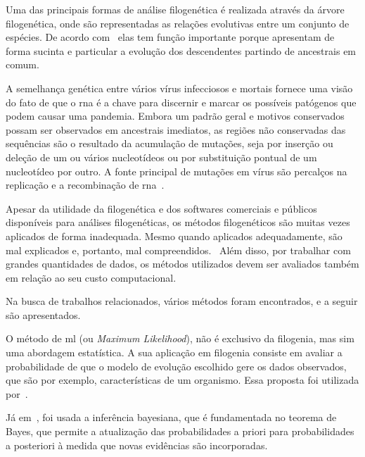 Uma das principais formas de análise filogenética é realizada através da árvore filogenética, onde são representadas as relações evolutivas entre um conjunto de espécies. De acordo com~\cite{morrison_tree_thinking} elas tem função importante porque apresentam de forma sucinta e particular a evolução dos descendentes partindo de ancestrais em comum.

A semelhança genética entre vários vírus infecciosos e mortais fornece uma visão do fato de que o \ac{rna} é a chave para discernir e marcar os possíveis patógenos que podem causar uma pandemia. Embora um padrão geral e motivos conservados possam ser observados em ancestrais imediatos, as regiões não conservadas das sequências são o resultado da acumulação de mutações, seja por inserção ou deleção de um ou vários nucleotídeos ou por substituição pontual de um nucleotídeo por outro. A fonte principal de mutações em vírus são percalços na replicação e a recombinação de \ac{rna}~\cite[p. 11]{behl_threat_2022}.


Apesar da utilidade da filogenética e dos softwares comerciais e públicos disponíveis para análises filogenéticas, os métodos filogenéticos são muitas vezes aplicados de forma inadequada. Mesmo quando aplicados adequadamente, são mal explicados e, portanto, mal compreendidos.~\cite[p. 1]{barry_phylogenetic_analysis_2006} Além disso, por trabalhar com grandes quantidades de dados, os métodos utilizados devem ser avaliados também em relação ao seu custo computacional.

Na busca de trabalhos relacionados, vários métodos foram encontrados, e a seguir são apresentados.

O método de \ac{ml} (ou \textit{Maximum Likelihood}), não é exclusivo da filogenia, mas sim uma abordagem estatística. A sua aplicação em filogenia consiste em avaliar a probabilidade de que o modelo de evolução escolhido gere os dados observados, que são por exemplo, características de um organismo. Essa proposta foi utilizada por~\cite{fall_genetic_diversity_2021,behl_threat_2022,shabbir_comprehensive_2020,hudu_hepatitis_2018,sallard_tracing_2021,paez-espino_diversity_evolution_2019,tang_evolutionary_2021,cho_analysis_2022}.

Já em~\cite{yin_systematic_2019, bedoya-pilozo_molecular_epidemiology_2018}, foi usada a inferência bayesiana, que é fundamentada no teorema de Bayes, que permite a atualização das probabilidades a priori para probabilidades a posteriori à medida que novas evidências são incorporadas.

